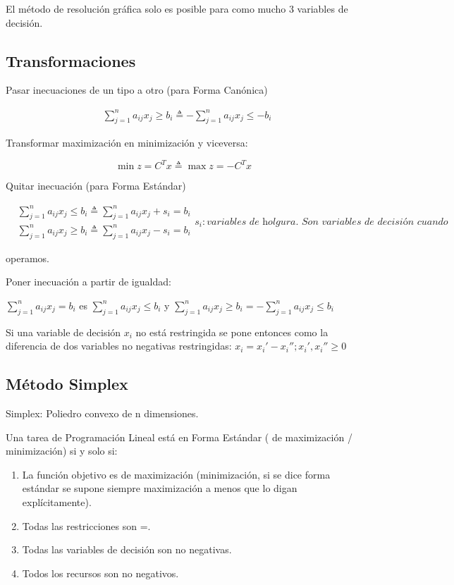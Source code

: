 \documentclass[12pt, twoside, openright]{report} %
\begin{document}
El método de resolución gráfica solo es posible para como mucho 3
variables de decisión.
\pagebreak
\subsection{Transformaciones}


Pasar inecuaciones de un tipo a otro (para Forma Canónica)

$$\begin{aligned}  &\sum\limits_{j=1}^{n} a_{i j} x_{j} \geqslant b_{i} \triangleq -\sum\limits_{j=1}^{n} a_{i j} x_{j}\leq -b_{i}  \end{aligned}$$

Transformar maximización en minimización y viceversa:


$$\min z = C^{T}x \triangleq \max z =- C^{T}x$$

Quitar inecuación (para Forma Estándar)

$$\begin{aligned}  &\sum\limits_{j=1}^{n} a_{i j} x_{j} \leqslant b_{i} \triangleq \sum\limits_{j=1}^{n} a_{i j} x_{j}+s_{i}=b_{i}\\  &\sum\limits_{j=1}^{n} a_{i j} x_{j} \geqslant b_{i} \triangleq \sum\limits_{j=1}^{n} a_{i j} x_{j}-s_{i}=b_{i}  \end{aligned}s_i: \textit{variables de holgura. Son variables de decisión cuando}$$

operamos.


Poner inecuación a partir de igualdad:

\(\sum\limits_{j=1}^{n} a_{i j} x_{j} = b_{i}\) es
\(\sum\limits_{j=1}^{n} a_{i j} x_{j} \leqslant b_{i}\) y
\(\sum\limits_{j=1}^{n} a_{i j} x_{j} \geq b_{i}= -\sum\limits_{j=1}^{n} a_{i j} x_{j} \leqslant b_{i}\)

Si una variable de decisión \(x_i\) no está restringida se pone
entonces como la diferencia de dos variables no negativas
restringidas: \(x_i=x_i'-x_i''; x_i',x_i'' \geq 0\)


\subsection{Método Simplex}

Simplex: Poliedro convexo de n dimensiones.

Una tarea de Programación Lineal está en Forma Estándar ( de
maximización / minimización) si y solo si:


\begin{enumerate}
	\def\labelenumi{\arabic{enumi}.}
	\item La función objetivo es de maximización (minimización, si se dice
	      forma estándar se supone siempre maximización a menos que lo digan
	      explícitamente).
	\item Todas las restricciones son =.
	\item Todas las variables de decisión son no negativas.
	\item Todos los recursos son no negativos.
\end{enumerate}
\pagebreak
\end{document}
